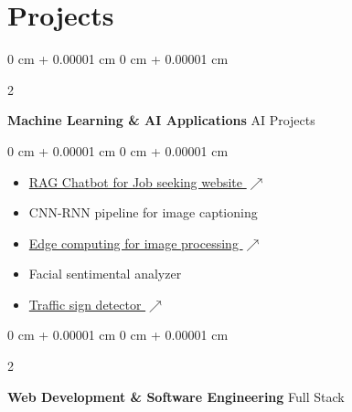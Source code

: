 \documentclass[10pt, letterpaper]{article}
\newenvironment{highlights}{
    \begin{itemize}[
        topsep=0.10 cm,
        parsep=0.10 cm,
        partopsep=0pt,
        itemsep=0pt,
        leftmargin=0 cm + 10pt
    ]
}{
    \end{itemize}
} %
\newenvironment{onecolentry}{
    \begin{adjustwidth}{
        0 cm + 0.00001 cm
    }{
        0 cm + 0.00001 cm
    }
}{
    \end{adjustwidth}
} %
\newenvironment{twocolentry}[2][]{
    \onecolentry
    \def\secondColumn{#2}
    \setcolumnwidth{\fill, 4.5 cm}
    \begin{paracol}{2}
}{
    \switchcolumn \raggedleft \secondColumn
    \end{paracol}
    \endonecolentry
} %
\begin{document}
\section{Projects}
        \begin{twocolentry}{
            AI Projects
        }
            \textbf{Machine Learning \& AI Applications}\end{twocolentry}
        \vspace{0.10 cm}
        \begin{onecolentry}
            \begin{highlights}
                \item \href{https://tintern-client.fly.dev/auth/login}{RAG Chatbot for Job seeking website $\scriptscriptstyle\nearrow$}
                \item {CNN-RNN pipeline for image captioning}
                \item \href{https://github.com/username/edge-computing}{Edge computing for image processing $\scriptscriptstyle\nearrow$}
                \item {Facial sentimental analyzer}
                \item \href{https://colab.research.google.com/drive/1RsQSTjeqqu1ld_p_izogjOq9LzKfr6m2?usp=sharing}{Traffic sign detector $\scriptscriptstyle\nearrow$}
            \end{highlights}
        \end{onecolentry}
        \vspace{0.2 cm}
        \begin{twocolentry}{
            Full Stack
        }
            \textbf{Web Development \& Software Engineering}\end{twocolentry}
        \vspace{0.10 cm}
\end{document}
